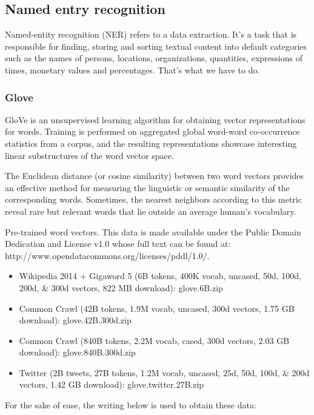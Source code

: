 \subsection{Named entry recognition}

Named-entity recognition (NER) refers to a data extraction. It's a task that is responsible for finding, storing and sorting textual content into default categories such as the names of persons, locations, organizations, quantities, expressions of times, monetary values and percentages. That's what we have to do.

\subsubsection{Glove}

GloVe is an unsupervised learning algorithm for obtaining vector representations for words. Training is performed on aggregated global word-word co-occurrence statistics from a corpus, and the resulting representations showcase interesting linear substructures of the word vector space.

The Euclidean distance (or cosine similarity) between two word vectors provides an effective method for measuring the linguistic or semantic similarity of the corresponding words. Sometimes, the nearest neighbors according to this metric reveal rare but relevant words that lie outside an average human's vocabulary.

Pre-trained word vectors. This data is made available under the Public Domain Dedication and License v1.0 whose full text can be found at: \\http://www.opendatacommons.org/licenses/pddl/1.0/.
\begin{itemize}
    \item Wikipedia 2014 + Gigaword 5 (6B tokens, 400K vocab, uncased, 50d, 100d, 200d, \& 300d vectors, 822 MB download): glove.6B.zip
    \item Common Crawl (42B tokens, 1.9M vocab, uncased, 300d vectors, 1.75 GB download): glove.42B.300d.zip
    \item Common Crawl (840B tokens, 2.2M vocab, cased, 300d vectors, 2.03 GB download): glove.840B.300d.zip
    \item Twitter (2B tweets, 27B tokens, 1.2M vocab, uncased, 25d, 50d, 100d, \& 200d vectors, 1.42 GB download): glove.twitter.27B.zip
\end{itemize}

For the sake of ease, the writing below is used to obtain these data:

